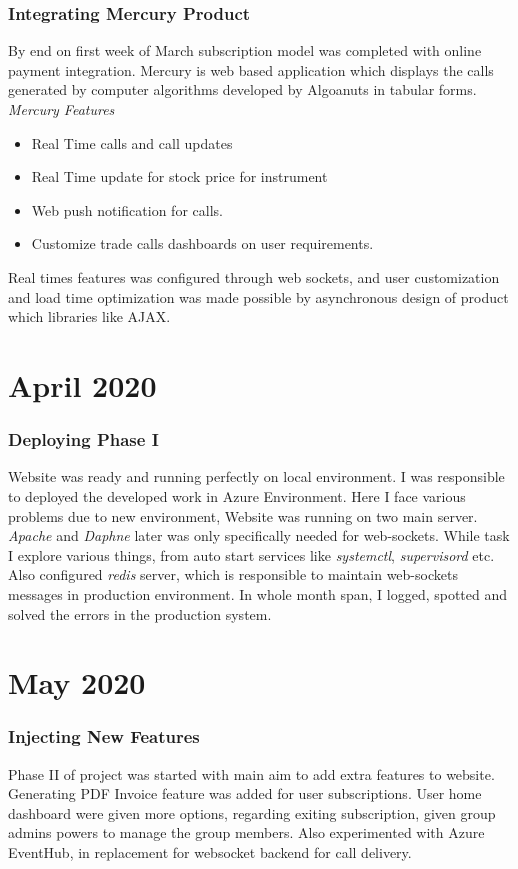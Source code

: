 \subsubsection{Integrating Mercury Product}
By end on first week of March subscription model was completed with online payment integration. Mercury is web based application which displays the calls generated by computer algorithms developed by Algoanuts in tabular forms. \\
\textit{Mercury Features}
\begin{itemize}
  \item Real Time calls and call updates
  \item Real Time update for stock price for instrument
  \item Web push notification for calls.
  \item Customize trade calls dashboards on user requirements.
\end{itemize}
Real times features was configured through web sockets, and user customization and load time optimization was made possible by asynchronous design of product which libraries like AJAX.


\section{April 2020}
\subsubsection{Deploying Phase I}
Website was ready and running perfectly on local environment. I was responsible to deployed the developed work in Azure Environment. Here I face various problems due to new environment, Website was running on two main server. \textit{Apache} and \textit{Daphne} later was only specifically needed for web-sockets. While task I explore various things, from auto start services like \textit{systemctl}, \textit{supervisord} etc. Also configured \textit{redis} server, which is responsible to maintain web-sockets messages in production environment. In whole month span, I logged, spotted and solved the errors in the production system.

\section{May 2020}
\subsubsection{Injecting New Features}
Phase II of project was started with main aim to add extra features to website. Generating PDF Invoice feature was added for user subscriptions. User home dashboard were given more options, regarding exiting subscription, given group admins powers to manage the group members. Also experimented with Azure EventHub, in replacement for websocket backend for call delivery.

